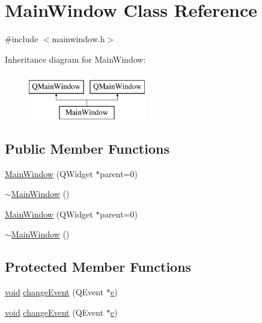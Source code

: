 \hypertarget{class_main_window}{\section{Main\-Window Class Reference}
\label{class_main_window}
}


{\ttfamily \#include $<$mainwindow.\-h$>$}

Inheritance diagram for Main\-Window\-:\begin{figure}[H]
\begin{center}
\leavevmode
\includegraphics[height=2.000000cm]{class_main_window}
\end{center}
\end{figure}
\subsection*{Public Member Functions}
\begin{DoxyCompactItemize}
\item 
\hyperlink{class_main_window_ga8b244be8b7b7db1b08de2a2acb9409db}{Main\-Window} (Q\-Widget $\ast$parent=0)
\item 
\hyperlink{class_main_window_gae98d00a93bc118200eeef9f9bba1dba7}{$\sim$\-Main\-Window} ()
\item 
\hyperlink{group___documentation_helper_ga8b244be8b7b7db1b08de2a2acb9409db}{Main\-Window} (Q\-Widget $\ast$parent=0)
\item 
\hyperlink{group___documentation_helper_gae98d00a93bc118200eeef9f9bba1dba7}{$\sim$\-Main\-Window} ()
\end{DoxyCompactItemize}
\subsection*{Protected Member Functions}
\begin{DoxyCompactItemize}
\item 
\hyperlink{group___u_a_v_objects_plugin_ga444cf2ff3f0ecbe028adce838d373f5c}{void} \hyperlink{class_main_window_gaf4ca5d0d3d18ddcb7d54b6596bbf4797}{change\-Event} (Q\-Event $\ast$\hyperlink{_o_p_plots_8m_a9425be9aab51621e317ba7ade564b570}{e})
\item 
\hyperlink{group___u_a_v_objects_plugin_ga444cf2ff3f0ecbe028adce838d373f5c}{void} \hyperlink{group___documentation_helper_gaf4ca5d0d3d18ddcb7d54b6596bbf4797}{change\-Event} (Q\-Event $\ast$\hyperlink{_o_p_plots_8m_a9425be9aab51621e317ba7ade564b570}{e})
\end{DoxyCompactItemize}


